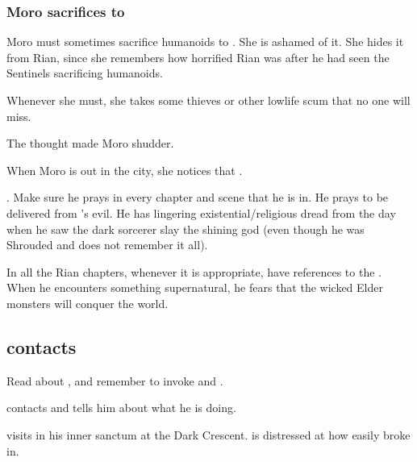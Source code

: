 \subsubsection{Moro sacrifices to {\Nasshikerr}}
Moro must sometimes sacrifice humanoids to \Nasshikerr. 
She is ashamed of it. 
She hides it from Rian, since she remembers how horrified Rian was after he had seen the Sentinels sacrificing humanoids. 

Whenever she must, she takes some thieves or other lowlife scum that no one will miss. 

\begin{prose}
  The thought made Moro shudder.  
\end{prose}

When Moro is out in the city, she notices that . 
    
.
Make sure he prays in every chapter and scene that he is in.
He prays to be delivered from \Isphet's evil. 
He has lingering existential/religious dread from the day when he saw the dark sorcerer slay the shining god (even though he was Shrouded and does not remember it all). 

In all the Rian chapters, whenever it is appropriate, have references to the . 
When he encounters something supernatural, he fears that the wicked Elder monsters will conquer the world. 









\subsection{\Ishnaruchaefir contacts \Secherdamon}
Read about , and remember to invoke \Sethicus and \Tiamat. 

\Ishnaruchaefir{} contacts \Secherdamon{} and tells him about what he is doing. 

\Ishnaruchaefir visits {\LocarPsyrex} in his inner sanctum at the Dark Crescent. 
\Psyrex is distressed at how easily \Ishnaruchaefir broke in. 


